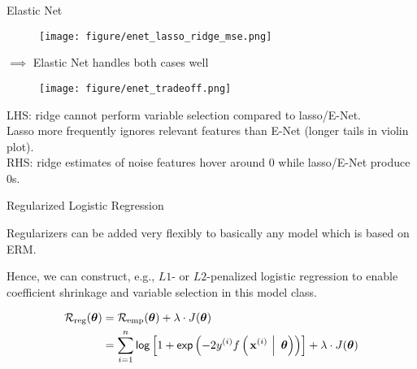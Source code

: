 \documentclass[11pt,compress,t,notes=noshow, xcolor=table]{beamer}
\begin{document}
\begin{vbframe} {Elastic Net}
\begin{figure}
\texttt{[image: figure/enet\_lasso\_ridge\_mse.png]}\\
\end{figure}
{\normalsize $\implies$ Elastic Net handles both cases well}
\framebreak

\begin{figure}
\texttt{[image: figure/enet\_tradeoff.png]}\\
\end{figure}


\footnotesize
LHS: ridge cannot perform variable selection compared to lasso/E-Net. \\
Lasso more frequently ignores relevant features than E-Net (longer tails in violin plot).\\
RHS: ridge estimates of noise features hover around $0$ while lasso/E-Net produce $0$s.

\end{vbframe}



\begin{vbframe}{Regularized Logistic Regression}

Regularizers can be added very flexibly to basically any model which is based on ERM.

\lz 

Hence, we can construct, e.g., $L1$- or $L2$-penalized logistic regression to enable coefficient shrinkage and variable selection in this model class. 


\begin{align*}
\mathcal{R}_{\text{reg}}(\bm{\theta}) &= \mathcal{R}_{\text{emp}}(\bm{\theta}) + \lambda \cdot J(\bm{\theta}) \\
&= \sum\limits_{i=1}^n \mathsf{log}\left[1 + \mathsf{exp}\left(-2y^{(i)} f\left(\left.\mathbf{x}^{(i)}~\right|~ \bm{\theta}\right)\right)\right] + \lambda \cdot J(\bm{\theta})
\end{align*}


\end{vbframe}
\end{document}

